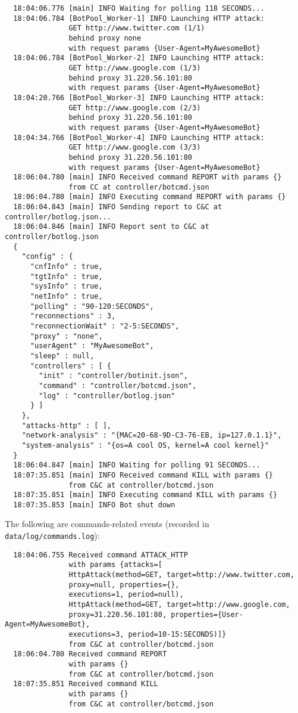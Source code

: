 \begin{verbatim}
  18:04:06.776 [main] INFO Waiting for polling 118 SECONDS...
  18:04:06.784 [BotPool_Worker-1] INFO Launching HTTP attack:
               GET http://www.twitter.com (1/1)
               behind proxy none
               with request params {User-Agent=MyAwesomeBot}
  18:04:06.784 [BotPool_Worker-2] INFO Launching HTTP attack:
               GET http://www.google.com (1/3)
               behind proxy 31.220.56.101:80
               with request params {User-Agent=MyAwesomeBot}
  18:04:20.766 [BotPool_Worker-3] INFO Launching HTTP attack:
               GET http://www.google.com (2/3)
               behind proxy 31.220.56.101:80
               with request params {User-Agent=MyAwesomeBot}
  18:04:34.766 [BotPool_Worker-4] INFO Launching HTTP attack:
               GET http://www.google.com (3/3)
               behind proxy 31.220.56.101:80
               with request params {User-Agent=MyAwesomeBot}
  18:06:04.780 [main] INFO Received command REPORT with params {}
               from CC at controller/botcmd.json
  18:06:04.780 [main] INFO Executing command REPORT with params {}
  18:06:04.843 [main] INFO Sending report to C&C at controller/botlog.json...
  18:06:04.846 [main] INFO Report sent to C&C at controller/botlog.json
  {
    "config" : {
      "cnfInfo" : true,
      "tgtInfo" : true,
      "sysInfo" : true,
      "netInfo" : true,
      "polling" : "90-120:SECONDS",
      "reconnections" : 3,
      "reconnectionWait" : "2-5:SECONDS",
      "proxy" : "none",
      "userAgent" : "MyAwesomeBot",
      "sleep" : null,
      "controllers" : [ {
        "init" : "controller/botinit.json",
        "command" : "controller/botcmd.json",
        "log" : "controller/botlog.json"
      } ]
    },
    "attacks-http" : [ ],
    "network-analysis" : "{MAC=20-68-9D-C3-76-EB, ip=127.0.1.1}",
    "system-analysis" : "{os=A cool OS, kernel=A cool kernel}"
  }
  18:06:04.847 [main] INFO Waiting for polling 91 SECONDS...
  18:07:35.851 [main] INFO Received command KILL with params {}
               from C&C at controller/botcmd.json
  18:07:35.851 [main] INFO Executing command KILL with params {}
  18:07:35.853 [main] INFO Bot shut down
\end{verbatim}

The following are commands-related events (recorded in \texttt{data/log/commands.log}):

\begin{verbatim}
  18:04:06.755 Received command ATTACK_HTTP
               with params {attacks=[
               HttpAttack(method=GET, target=http://www.twitter.com,
               proxy=null, properties={},
               executions=1, period=null),
               HttpAttack(method=GET, target=http://www.google.com,
               proxy=31.220.56.101:80, properties={User-Agent=MyAwesomeBot},
               executions=3, period=10-15:SECONDS)]}
               from C&C at controller/botcmd.json
  18:06:04.780 Received command REPORT
               with params {}
               from C&C at controller/botcmd.json
  18:07:35.851 Received command KILL
               with params {}
               from C&C at controller/botcmd.json
\end{verbatim}


